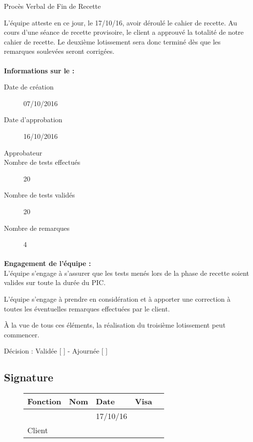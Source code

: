\documentclass[asi, sansVersion]{picInsa}
\begin{document}
 
 \begin{center}
  \LARGE{}
    Procès Verbal de Fin de Recette\\
 \end{center}
 
 \normalsize{}
 
L'équipe \nomEquipe{} atteste en ce jour, le 17/10/16, avoir déroulé le cahier de recette.
Au cours d'une séance de recette provisoire, le client a approuvé la totalité de notre cahier de recette. Le deuxième lotissement sera donc terminé dès que les remarques soulevées seront corrigées.


\paragraph{}
\textbf{Informations sur le \CDR :}

\begin{description}
  \item[Date de création]07/10/2016
  \item[Date d'approbation]16/10/2016
  \item[Approbateur]\nomClient
  \item[Nombre de tests effectués]20
  \item[Nombre de tests validés]20
  \item[Nombre de remarques]4
\end{description}


\paragraph{}
\textbf{Engagement de l'équipe :}\\


L'équipe \nomEquipe{} s'engage à s'assurer que les tests menés lors de la phase de recette soient valides sur toute la durée du PIC.


L'équipe \nomEquipe{} s'engage à prendre en considération et à apporter une correction à toutes les éventuelles remarques effectuées par le client.

À la vue de tous ces éléments, la réalisation du troisième lotissement peut commencer.

\begin{center}
Décision : Validée [ \checkmark{} ] - Ajournée [ ]
\end{center}

\subsection*{Signature}
\begin{figure}[H]
		\centering
		\begin{tabularx}{17cm}{|p{4cm}|X|X|X|X|}
		\hline
		\rowcolor[gray]{0.85} Fonction & Nom & Date & Visa \\
		\hline
		\CP{} & \Pierre{} & 17/10/16 & \\
		\hline
		Client & \nomClient & & \\
		\hline
		\end{tabularx}
\end{figure}
\end{document}
